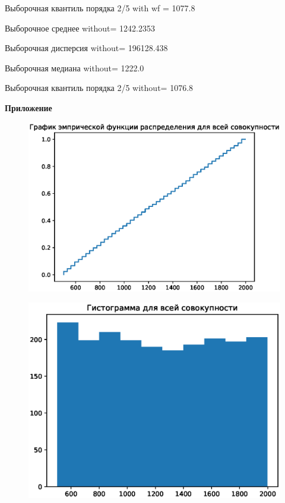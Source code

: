 \documentclass{article}
\begin{document}
Выборочная квантиль порядка 2/5 with wf = 1077.8

Выборочное среднее without= 1242.2353

Выборочная дисперсия without= 196128.438

Выборочная медиана without= 1222.0

Выборочная квантиль порядка 2/5 without= 1076.8
\vspace{5mm}

\newpage
\textbf{Приложение}

\begin{figure}[!h]
\begin{center}
\includegraphics [scale=0.4]{images/ecdf1.eps}
\end{center}
\end{figure}

\begin{figure}[!h]
\begin{center}
\includegraphics [scale=0.4]{images/hist1.eps}
\end{center}
\end{figure}
\end{document}
